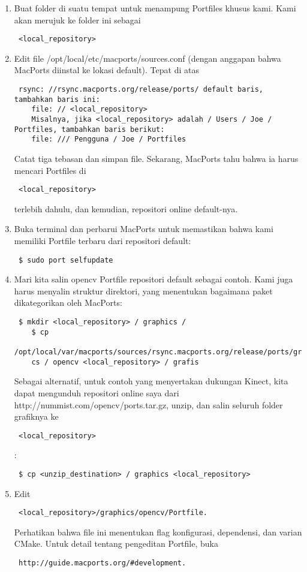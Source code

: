 \begin{enumerate}
	\item Buat folder di suatu tempat untuk menampung Portfiles khusus kami. Kami akan merujuk ke folder ini sebagai \begin{verbatim} <local_repository> \end{verbatim}
	\item Edit file /opt/local/etc/macports/sources.conf (dengan anggapan bahwa MacPorts diinstal ke lokasi default). Tepat di atas
	\begin{verbatim} rsync: //rsync.macports.org/release/ports/ default baris, tambahkan baris ini:
	file: // <local_repository>
	Misalnya, jika <local_repository> adalah / Users / Joe / Portfiles, tambahkan baris berikut:
	file: /// Pengguna / Joe / Portfiles \end{verbatim}
	Catat tiga tebasan dan simpan file. Sekarang, MacPorts tahu bahwa ia harus mencari Portfiles di \begin{verbatim} <local_repository> \end{verbatim} terlebih dahulu, dan kemudian, repositori online default-nya.
	\item Buka terminal dan perbarui MacPorts untuk memastikan bahwa kami memiliki Portfile terbaru dari repositori default:
	\begin{verbatim} $ sudo port selfupdate \end{verbatim}
	\item Mari kita salin opencv Portfile repositori default sebagai contoh. Kami juga harus menyalin struktur direktori, yang menentukan bagaimana paket dikategorikan oleh MacPorts:
	\begin{verbatim} $ mkdir <local_repository> / graphics /
	$ cp
	/opt/local/var/macports/sources/rsync.macports.org/release/ports/graphi
	cs / opencv <local_repository> / grafis \end{verbatim}
	Sebagai alternatif, untuk contoh yang menyertakan dukungan Kinect, kita dapat mengunduh repositori online saya dari http://nummist.com/opencv/ports.tar.gz, unzip, dan salin seluruh folder grafiknya ke \begin{verbatim} <local_repository> \end{verbatim}:
	\begin{verbatim} $ cp <unzip_destination> / graphics <local_repository> \end{verbatim}
	\item Edit \begin{verbatim} <local_repository>/graphics/opencv/Portfile. \end{verbatim} Perhatikan bahwa file ini menentukan flag konfigurasi, dependensi, dan varian CMake. Untuk detail tentang pengeditan Portfile, buka \begin{verbatim} http://guide.macports.org/#development. \end{verbatim}

\end{enumerate}
